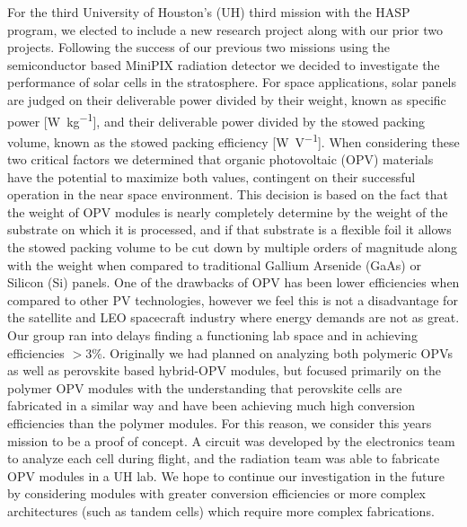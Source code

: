 	For the third University of Houston's (UH) third mission with the HASP program, we elected to include a new research project along with our prior two projects. Following the success of our previous two missions \cite{SORA1} \cite{SORA2} using the semiconductor based MiniPIX radiation detector we decided to investigate the performance of solar cells in the stratosphere. For space applications, solar panels are judged on their deliverable power divided by their weight, known as specific power [\si{\watt\per\kilo\gram}], and their deliverable power divided by the stowed packing volume, known as the stowed packing efficiency [\si{\watt\per\volt}]. When considering these two critical factors we determined that organic photovoltaic (OPV) materials have the potential to maximize both values, contingent on their successful operation in the near space environment. This decision is based on the fact that the weight of OPV modules is nearly completely determine by the weight of the substrate on which it is processed, and if that substrate is a flexible foil it allows the stowed packing volume to be cut down by multiple orders of magnitude along with the weight when compared to traditional Gallium Arsenide (GaAs) or Silicon (Si) panels. One of the drawbacks of OPV has been lower efficiencies when compared to other PV technologies, however we feel this is not a disadvantage for the satellite and LEO spacecraft industry where energy demands are not as great.\\
	
	 Our group ran into delays finding a functioning lab space and in achieving efficiencies $>$3\%. Originally we had planned on analyzing both polymeric OPVs as well as perovskite based hybrid-OPV modules, but focused primarily on the polymer OPV modules with the understanding that perovskite cells are fabricated in a similar way and have been achieving much high conversion efficiencies than the polymer modules. For this reason, we consider this years mission to be a proof of concept. A circuit was developed by the electronics team to analyze each cell during flight, and the radiation team was able to fabricate OPV modules in a UH lab. We hope to continue our investigation in the future by considering modules with greater conversion efficiencies or more complex architectures (such as tandem cells) which require more complex fabrications. 
